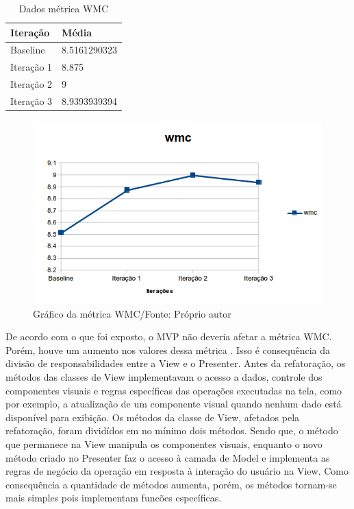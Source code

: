 \begin{table}[!h]
	\centering
	\caption{Dados métrica WMC}
    \begin{tabular}{ | l | l | }
    \hline
    Iteração & Média 			\\ \hline
    Baseline & 8.5161290323   	\\ \hline
    Iteração 1 & 8.875			\\ \hline
	Iteração 2 & 9				\\ \hline
	Iteração 3 & 8.9393939394	\\ \hline
    \end{tabular}
    
    \label{tab:wmc}
\end{table}

\begin{figure}[!h]
	\centering
	\includegraphics{img/wmc.png}
	\caption{Gráfico da métrica WMC/Fonte: Próprio autor} 
	\label{fig:wmc}
\end{figure}


De acordo com o que foi exposto, o MVP não deveria afetar a métrica WMC. Porém,
houve um aumento nos valores dessa métrica . Isso é consequência da divisão de
responsabilidades entre a View e o Presenter. Antes da refatoração, os métodos
das classes de View implementavam o acesso a dados, controle dos componentes
visuais e regras específicas das operações executadas na tela, como por exemplo,
a atualização de um componente visual quando nenhum dado está disponível para
exibição. Os métodos da classe de View, afetados pela refatoração, foram
dividídos em no mínimo dois métodos. Sendo que, o método que permanece na View
manipula os componentes visuais, enquanto o novo método criado no Presenter faz
o acesso à camada de Model e implementa as regras de negócio da operação em
resposta à interação do usuário na View. Como consequência a quantidade de
métodos aumenta, porém, os métodos tornam-se mais simples pois implementam
funcões específicas. 

